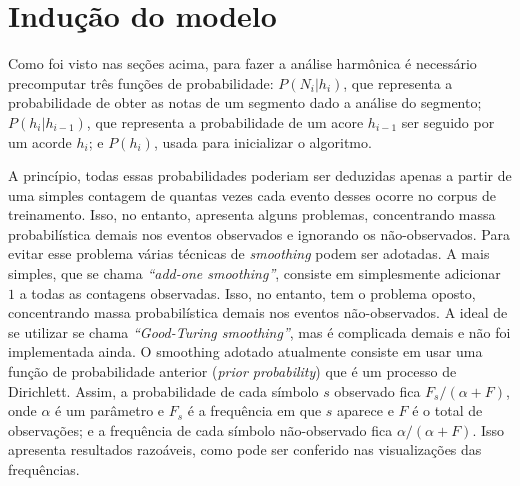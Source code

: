 \documentclass{article}
\begin{document}
\section{Indução do modelo}
\label{sec:modelo}

Como foi visto nas seções acima, para fazer a análise harmônica é
necessário precomputar três funções de probabilidade: $P(N_i|h_i)$,
que representa a probabilidade de obter as notas de um segmento dado a
análise do segmento; $P(h_i|h_{i-1})$, que representa a probabilidade
de um acore $h_{i-1}$ ser seguido por um acorde $h_i$; e $P(h_i)$,
usada para inicializar o algoritmo.

A princípio, todas essas probabilidades poderiam ser deduzidas apenas
a partir de uma simples contagem de quantas vezes cada evento desses
ocorre no corpus de treinamento. Isso, no entanto, apresenta alguns
problemas, concentrando massa probabilística demais nos eventos
observados e ignorando os não-observados. Para evitar esse problema
várias técnicas de \textit{smoothing} podem ser adotadas. A mais
simples, que se chama \textit{``add-one smoothing''}, consiste em
simplesmente adicionar $1$ a todas as contagens observadas. Isso, no
entanto, tem o problema oposto, concentrando massa probabilística
demais nos eventos não-observados. A ideal de se utilizar se chama
\textit{``Good-Turing smoothing''}, mas é complicada demais e não foi
implementada ainda. O smoothing adotado atualmente consiste em usar
uma função de probabilidade anterior (\textit{prior probability}) que
é um processo de Dirichlett. Assim, a probabilidade de cada símbolo
$s$ observado fica $F_s/(\alpha + F)$, onde $\alpha$ é um parâmetro e
$F_s$ é a frequência em que $s$ aparece e $F$ é o total de
observações; e a frequência de cada símbolo não-observado fica
$\alpha/(\alpha + F)$. Isso apresenta resultados razoáveis, como pode
ser conferido nas visualizações das frequências.
\end{document}
